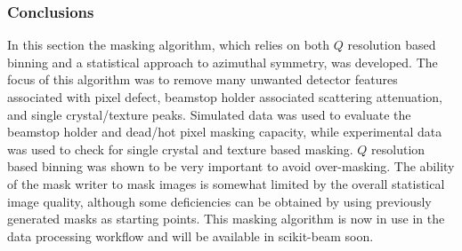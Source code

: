 \subsubsection{Conclusions}
In this section the masking algorithm, which relies on both $Q$ resolution based binning and a statistical approach to azimuthal symmetry, was developed.
The focus of this algorithm was to remove many unwanted detector features associated with pixel defect, beamstop holder associated scattering attenuation, and single crystal/texture peaks.
Simulated data was used to evaluate the beamstop holder and dead/hot pixel masking capacity, while experimental data was used to check for single crystal and texture based masking.
$Q$ resolution based binning was shown to be very important to avoid over-masking.
The ability of the mask writer to mask images is somewhat limited by the overall statistical image quality, although some deficiencies can be obtained by using previously generated masks as starting points.
This masking algorithm is now in use in the data processing workflow and will be available in scikit-beam soon.
